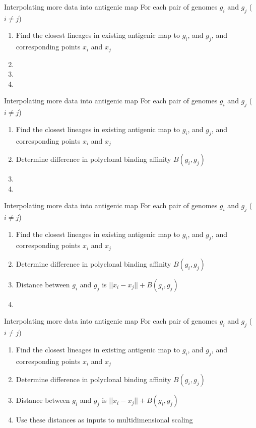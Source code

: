 \documentclass{beamer}
\begin{document}
\begin{frame}{Interpolating more data into antigenic map}
    For each pair of genomes $g_i$ and $g_j$ ($i\neq j$)
    \begin{enumerate}
        \item Find the closest lineages in existing antigenic map to $g_i$, and $g_j$, and corresponding points $x_i$ and $x_j$
        \item 
        \item
        \item 
    \end{enumerate}
\end{frame}
\begin{frame}{Interpolating more data into antigenic map}
    For each pair of genomes $g_i$ and $g_j$ ($i\neq j$)
    \begin{enumerate}
        \item Find the closest lineages in existing antigenic map to $g_i$, and $g_j$, and corresponding points $x_i$ and $x_j$
        \item Determine difference in polyclonal binding affinity $B(g_i,g_j)$
        \item
        \item
    \end{enumerate}
\end{frame}
\begin{frame}{Interpolating more data into antigenic map}
    For each pair of genomes $g_i$ and $g_j$ ($i\neq j$)
    \begin{enumerate}
        \item Find the closest lineages in existing antigenic map to $g_i$, and $g_j$, and corresponding points $x_i$ and $x_j$
        \item Determine difference in polyclonal binding affinity $B(g_i,g_j)$
        \item Distance between $g_i$ and $g_j$ is $||x_i - x_j|| + B(g_i,g_j)$
        \item
    \end{enumerate}
\end{frame}
\begin{frame}{Interpolating more data into antigenic map}
    For each pair of genomes $g_i$ and $g_j$ ($i\neq j$)
    \begin{enumerate}
        \item Find the closest lineages in existing antigenic map to $g_i$, and $g_j$, and corresponding points $x_i$ and $x_j$
        \item Determine difference in polyclonal binding affinity $B(g_i,g_j)$
        \item Distance between $g_i$ and $g_j$ is $||x_i - x_j|| + B(g_i,g_j)$
        \item Use these distances as inputs to multidimensional scaling
    \end{enumerate}
\end{frame}
\end{document}
